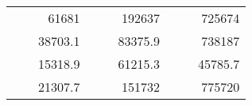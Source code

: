 \begin{table}[H]
\begin{tabular}{|ccrccrccc}
\rowcolor[HTML]{DDFDFF} 
\multicolumn{1}{|c|}{\cellcolor[HTML]{FFFFC7}}                                & \multicolumn{1}{c|}{\cellcolor[HTML]{DDFDFF}}                      & \multicolumn{1}{r|}{\cellcolor[HTML]{DAE8FC}61681}     & \multicolumn{1}{c|}{\cellcolor[HTML]{FFFFC7}}                                & \multicolumn{1}{c|}{\cellcolor[HTML]{DDFDFF}}                       & \multicolumn{1}{r|}{\cellcolor[HTML]{DDFDFF}192637}    & \multicolumn{1}{c|}{\cellcolor[HTML]{FFFFC7}}                                & \multicolumn{1}{c|}{\cellcolor[HTML]{DDFDFF}}                      & \multicolumn{1}{r|}{\cellcolor[HTML]{DDFDFF}725674}    \\ \cline{3-3} \cline{6-6} \cline{9-9} 
\multicolumn{1}{|c|}{\cellcolor[HTML]{FFFFC7}}                                & \multicolumn{1}{c|}{\cellcolor[HTML]{DDFDFF}}                      & \multicolumn{1}{r|}{\cellcolor[HTML]{DDFDFF}38703.1}   & \multicolumn{1}{c|}{\cellcolor[HTML]{FFFFC7}}                                & \multicolumn{1}{c|}{\cellcolor[HTML]{DDFDFF}}                       & \multicolumn{1}{r|}{\cellcolor[HTML]{DAE8FC}83375.9}   & \multicolumn{1}{c|}{\cellcolor[HTML]{FFFFC7}}                                & \multicolumn{1}{c|}{\cellcolor[HTML]{DDFDFF}}                      & \multicolumn{1}{r|}{\cellcolor[HTML]{DAE8FC}738187}    \\ \cline{3-3} \cline{6-6} \cline{9-9} 
\rowcolor[HTML]{DDFDFF} 
\multicolumn{1}{|c|}{\cellcolor[HTML]{FFFFC7}}                                & \multicolumn{1}{c|}{\cellcolor[HTML]{DDFDFF}}                      & \multicolumn{1}{r|}{\cellcolor[HTML]{DAE8FC}15318.9}   & \multicolumn{1}{c|}{\cellcolor[HTML]{FFFFC7}}                                & \multicolumn{1}{c|}{\cellcolor[HTML]{DDFDFF}}                       & \multicolumn{1}{r|}{\cellcolor[HTML]{DDFDFF}61215.3}   & \multicolumn{1}{c|}{\cellcolor[HTML]{FFFFC7}}                                & \multicolumn{1}{c|}{\cellcolor[HTML]{DDFDFF}}                      & \multicolumn{1}{r|}{\cellcolor[HTML]{DDFDFF}45785.7}   \\ \cline{3-3} \cline{6-6} \cline{9-9} 
\multicolumn{1}{|c|}{\cellcolor[HTML]{FFFFC7}}                                & \multicolumn{1}{c|}{\cellcolor[HTML]{DDFDFF}}                      & \multicolumn{1}{r|}{\cellcolor[HTML]{DDFDFF}21307.7}   & \multicolumn{1}{c|}{\cellcolor[HTML]{FFFFC7}}                                & \multicolumn{1}{c|}{\cellcolor[HTML]{DDFDFF}}                       & \multicolumn{1}{r|}{\cellcolor[HTML]{DAE8FC}151732}    & \multicolumn{1}{c|}{\cellcolor[HTML]{FFFFC7}}                                & \multicolumn{1}{c|}{\cellcolor[HTML]{DDFDFF}}                      & \multicolumn{1}{r|}{\cellcolor[HTML]{DAE8FC}775720}    \\ \cline{3-3} \cline{6-6} \cline{9-9} 

\end{tabular}
\end{table}
